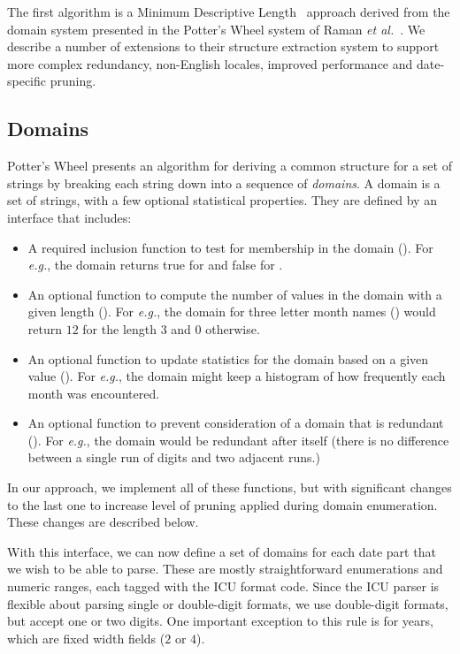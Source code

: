 The first algorithm is a Minimum Descriptive Length~\cite{Rissanen:1978} approach derived from the domain system presented in the Potter's Wheel system of Raman \textit{et al.}~\cite{Raman:2001}. We describe a number of extensions to their structure extraction system to support more complex redundancy, non-English locales, improved performance and date-specific pruning.

\subsection{Domains}
Potter's Wheel presents an algorithm for deriving a common structure for a set of strings by breaking each string down into a sequence of \textit{domains}. A domain is a set of strings, with a few optional statistical properties. They are defined by an interface that includes:
\begin{itemize}
\setlength\itemsep{0em}
\item A required inclusion function to test for membership in the domain (). 
For \textit{e.g.}, the domain  returns true for  
and false for .
\item An optional function to compute the number of values in the domain with a given length ().
For \textit{e.g.}, the domain for three letter month names () would return $12$ for the length $3$ and $0$ otherwise.
\item An optional function to update statistics for the domain based on a given value ().
For \textit{e.g.}, the domain  might keep a histogram of how frequently each month was encountered.
\item An optional function to prevent consideration of a domain that is redundant ().
For \textit{e.g.}, the domain  would be redundant after itself 
(\ie there is no difference between a single run of digits and two adjacent runs.)
\end{itemize}

In our approach, we implement all of these functions, but with significant changes to the last one to increase level of pruning applied during
domain enumeration. These changes are described below.

With this interface, we can now define a set of domains for each date part that we wish to be able to parse. These are mostly straightforward enumerations and numeric ranges, each tagged with the ICU format code. Since the ICU parser is flexible about parsing single or double-digit formats, we use double-digit formats, but accept one or two digits. One important exception to this rule is for years, which are fixed width fields ($2$ or $4$).

